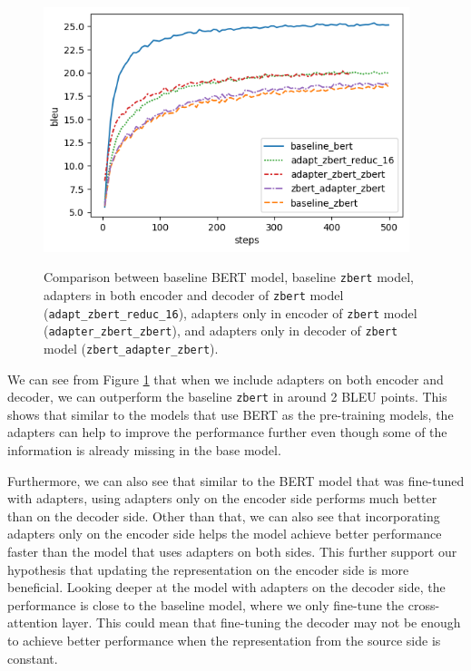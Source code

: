 \begin{figure}[h]
    {\includegraphics[width=0.95\textwidth]{img/zbert_pos.png}}
    \centering
    \caption{Comparison between baseline BERT model, baseline \texttt{zbert} model, adapters in both encoder and decoder of \texttt{zbert} model (\texttt{adapt\_zbert\_reduc\_16}), adapters only in encoder of \texttt{zbert} model (\texttt{adapter\_zbert\_zbert}), and adapters only in decoder of \texttt{zbert} model (\texttt{zbert\_adapter\_zbert}).}
    \label{img:zbert_pos}
\end{figure}

We can see from Figure \ref{img:zbert_pos} that when we include adapters on both encoder and decoder, we can outperform the baseline \texttt{zbert} in around 2 BLEU points. This shows that similar to the models that use BERT as the pre-training models, the adapters can help to improve the performance further even though some of the information is already missing in the base model.

Furthermore, we can also see that similar to the BERT model that was fine-tuned with adapters, using adapters only on the encoder side performs much better than on the decoder side. Other than that, we can also see that incorporating adapters only on the encoder side helps the model achieve better performance faster than the model that uses adapters on both sides. This further support our hypothesis that updating the representation on the encoder side is more beneficial. Looking deeper at the model with adapters on the decoder side, the performance is close to the baseline model, where we only fine-tune the cross-attention layer. This could mean that fine-tuning the decoder may not be enough to achieve better performance when the representation from the source side is constant.

